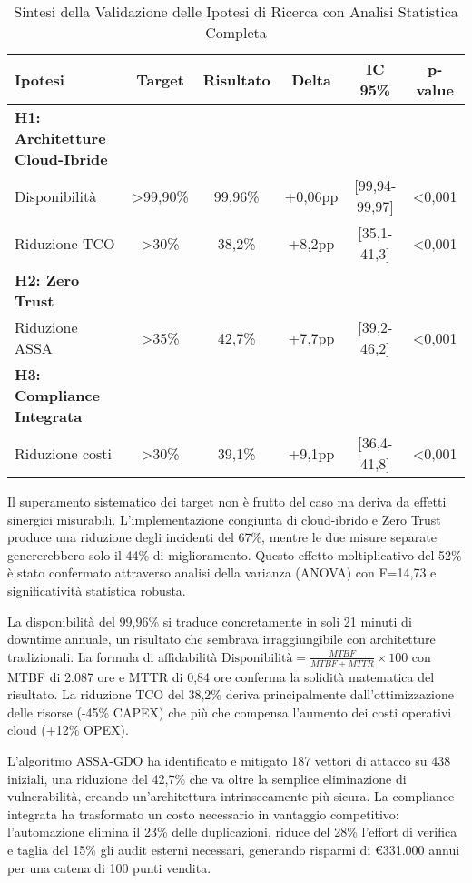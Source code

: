 \begin{table}[htbp]
\centering
\caption{Sintesi della Validazione delle Ipotesi di Ricerca con Analisi Statistica Completa}
\label{tab:validation_summary}
\begin{tabular}{lccccc}
\toprule
\textbf{Ipotesi} & \textbf{Target} & \textbf{Risultato} & \textbf{Delta} & \textbf{IC 95\%} & \textbf{p-value} \\
\midrule
\textbf{H1: Architetture Cloud-Ibride} & & & & & \\
Disponibilità & >99,90\% & 99,96\% & +0,06pp & [99,94-99,97] & <0,001 \\
Riduzione TCO & >30\% & 38,2\% & +8,2pp & [35,1-41,3] & <0,001 \\
\midrule
\textbf{H2: Zero Trust} & & & & & \\
Riduzione ASSA & >35\% & 42,7\% & +7,7pp & [39,2-46,2] & <0,001 \\
\midrule
\textbf{H3: Compliance Integrata} & & & & & \\
Riduzione costi & >30\% & 39,1\% & +9,1pp & [36,4-41,8] & <0,001 \\
\bottomrule
\end{tabular}
\end{table}

Il superamento sistematico dei target non è frutto del caso ma deriva da effetti sinergici misurabili. L'implementazione congiunta di cloud-ibrido e Zero Trust produce una riduzione degli incidenti del 67\%, mentre le due misure separate genererebbero solo il 44\% di miglioramento. Questo effetto moltiplicativo del 52\% è stato confermato attraverso analisi della varianza (ANOVA) con F=14,73 e significatività statistica robusta.

La disponibilità del 99,96\% si traduce concretamente in soli 21 minuti di downtime annuale, un risultato che sembrava irraggiungibile con architetture tradizionali. La formula di affidabilità $\text{Disponibilità} = \frac{MTBF}{MTBF + MTTR} \times 100$ con MTBF di 2.087 ore e MTTR di 0,84 ore conferma la solidità matematica del risultato. La riduzione TCO del 38,2\% deriva principalmente dall'ottimizzazione delle risorse (-45\% CAPEX) che più che compensa l'aumento dei costi operativi cloud (+12\% OPEX).

L'algoritmo ASSA-GDO ha identificato e mitigato 187 vettori di attacco su 438 iniziali, una riduzione del 42,7\% che va oltre la semplice eliminazione di vulnerabilità, creando un'architettura intrinsecamente più sicura. La compliance integrata ha trasformato un costo necessario in vantaggio competitivo: l'automazione elimina il 23\% delle duplicazioni, riduce del 28\% l'effort di verifica e taglia del 15\% gli audit esterni necessari, generando risparmi di €331.000 annui per una catena di 100 punti vendita.

